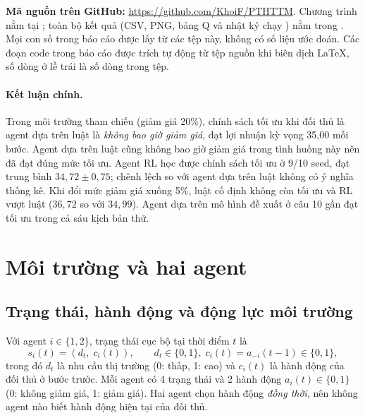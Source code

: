 \documentclass[12pt,a4paper]{report}
\begin{document}
\noindent\textbf{Mã nguồn trên GitHub:} \url{https://github.com/KhoiF/PTHTTM}.
Chương trình nằm tại ; toàn bộ kết quả
(CSV, PNG, bảng Q và nhật ký chạy ) nằm trong
. Mọi con số trong báo cáo được lấy từ các tệp
này, không có số liệu ước đoán. Các đoạn code trong báo cáo được trích tự động từ
tệp nguồn khi biên dịch LaTeX, số dòng ở lề trái là số dòng trong tệp.

\paragraph{Kết luận chính.} Trong môi trường tham chiếu (giảm giá 20\%), chính sách
tối ưu khi đối thủ là agent dựa trên luật là \emph{không bao giờ giảm giá}, đạt
lợi nhuận kỳ vọng 35{,}00 mỗi bước. Agent dựa trên luật cũng không bao giờ giảm giá
trong tình huống này nên đã đạt đúng mức tối ưu. Agent RL học được chính sách
tối ưu ở 9/10 seed, đạt trung bình $34{,}72\pm0{,}75$; chênh lệch so với agent dựa
trên luật không có ý nghĩa thống kê. Khi đổi mức giảm giá xuống 5\%, luật cố định
không còn tối ưu và RL vượt luật ($36{,}72$ so với $34{,}99$). Agent dựa trên mô hình
đề xuất ở câu 10 gần đạt tối ưu trong cả sáu kịch bản thử.

\section{Môi trường và hai agent}
\label{chap:model}

\subsection{Trạng thái, hành động và động lực môi trường}
Với agent $i\in\{1,2\}$, trạng thái cục bộ tại thời điểm $t$ là
\begin{equation}
s_i(t)=(d_t,\;c_i(t)),\qquad d_t\in\{0,1\},\; c_i(t)=a_{-i}(t-1)\in\{0,1\},
\end{equation}
trong đó $d_t$ là nhu cầu thị trường (0: thấp, 1: cao) và $c_i(t)$ là hành động
của đối thủ ở bước trước. Mỗi agent có 4 trạng thái và 2 hành động
$a_i(t)\in\{0,1\}$ (0: không giảm giá, 1: giảm giá). Hai agent chọn hành động
\emph{đồng thời}, nên không agent nào biết hành động hiện tại của đối thủ.
\end{document}
